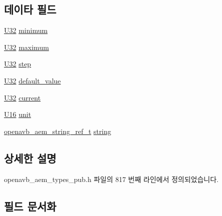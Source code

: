 \subsection*{데이타 필드}
\begin{DoxyCompactItemize}
\item 
\hyperlink{openavb__types__base__pub_8h_a696390429f2f3b644bde8d0322a24124}{U32} \hyperlink{structopenavb__aem__control__value__format__control__linear__uint32__t_a59ad8b0017df5c554e5191d6a0dc4749}{minimum}
\item 
\hyperlink{openavb__types__base__pub_8h_a696390429f2f3b644bde8d0322a24124}{U32} \hyperlink{structopenavb__aem__control__value__format__control__linear__uint32__t_a2d16c60a39b5fbab4b96ac13f7cf44e5}{maximum}
\item 
\hyperlink{openavb__types__base__pub_8h_a696390429f2f3b644bde8d0322a24124}{U32} \hyperlink{structopenavb__aem__control__value__format__control__linear__uint32__t_abe90485ea5a1283754873df1d1334871}{step}
\item 
\hyperlink{openavb__types__base__pub_8h_a696390429f2f3b644bde8d0322a24124}{U32} \hyperlink{structopenavb__aem__control__value__format__control__linear__uint32__t_a44b19d4c8e28a4227b51ee03fab7ab4c}{default\+\_\+value}
\item 
\hyperlink{openavb__types__base__pub_8h_a696390429f2f3b644bde8d0322a24124}{U32} \hyperlink{structopenavb__aem__control__value__format__control__linear__uint32__t_af3c6499686ed50a0e5b95a002e55f9ca}{current}
\item 
\hyperlink{openavb__types__base__pub_8h_a0a0a322d5fa4a546d293a77ba8b4a71f}{U16} \hyperlink{structopenavb__aem__control__value__format__control__linear__uint32__t_a0b3ff376c10369016824076deacc055e}{unit}
\item 
\hyperlink{structopenavb__aem__string__ref__t}{openavb\+\_\+aem\+\_\+string\+\_\+ref\+\_\+t} \hyperlink{structopenavb__aem__control__value__format__control__linear__uint32__t_a1f81001cefa769cb3651172fd5ab0748}{string}
\end{DoxyCompactItemize}


\subsection{상세한 설명}


openavb\+\_\+aem\+\_\+types\+\_\+pub.\+h 파일의 817 번째 라인에서 정의되었습니다.



\subsection{필드 문서화}

